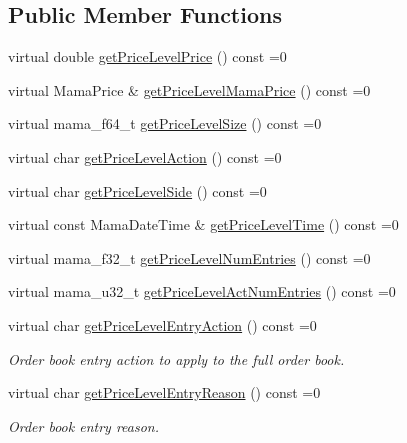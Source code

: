 \subsection*{Public Member Functions}
\begin{CompactItemize}
\item 
virtual double \hyperlink{classWombat_1_1MamdaBookAtomicLevelEntry_a82493957cc92858ad4f0c1d5cfbbbec}{get\-Price\-Level\-Price} () const =0
\item 
virtual Mama\-Price \& \hyperlink{classWombat_1_1MamdaBookAtomicLevelEntry_ac54c871b12fb6c0c59f255633cc7496}{get\-Price\-Level\-Mama\-Price} () const =0
\item 
virtual mama\_\-f64\_\-t \hyperlink{classWombat_1_1MamdaBookAtomicLevelEntry_71d87bca919520a7167af8a3e4d81113}{get\-Price\-Level\-Size} () const =0
\item 
virtual char \hyperlink{classWombat_1_1MamdaBookAtomicLevelEntry_fbb4050a6bc3e970e97b2014b48212ba}{get\-Price\-Level\-Action} () const =0
\item 
virtual char \hyperlink{classWombat_1_1MamdaBookAtomicLevelEntry_d88e0d4cbd92ef03b612fb9dc7e60ded}{get\-Price\-Level\-Side} () const =0
\item 
virtual const Mama\-Date\-Time \& \hyperlink{classWombat_1_1MamdaBookAtomicLevelEntry_690eb5e3517b64ba86681eabd71a2b02}{get\-Price\-Level\-Time} () const =0
\item 
virtual mama\_\-f32\_\-t \hyperlink{classWombat_1_1MamdaBookAtomicLevelEntry_2b0e245946eb50433a6d88f6f60da675}{get\-Price\-Level\-Num\-Entries} () const =0
\item 
virtual mama\_\-u32\_\-t \hyperlink{classWombat_1_1MamdaBookAtomicLevelEntry_9c206e1b9ce877f5a5386dc79721aed6}{get\-Price\-Level\-Act\-Num\-Entries} () const =0
\item 
virtual char \hyperlink{classWombat_1_1MamdaBookAtomicLevelEntry_685db14a553ce94346b62f7d7b8b5b5a}{get\-Price\-Level\-Entry\-Action} () const =0
\begin{CompactList}\small\item\em Order book entry action to apply to the full order book. \item\end{CompactList}\item 
virtual char \hyperlink{classWombat_1_1MamdaBookAtomicLevelEntry_222418d457ef30752c22e8aa63a61b50}{get\-Price\-Level\-Entry\-Reason} () const =0
\begin{CompactList}\small\item\em Order book entry reason. \item\end{CompactList}\item 

\end{CompactItemize}
